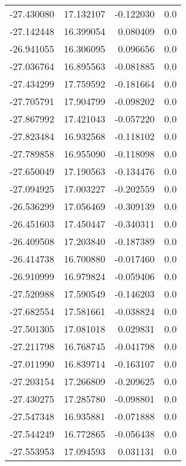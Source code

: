 \begin{tabular}{rrrr}
      -27.430080 &        17.132107 &   -0.122030 &   0.0 \\
      -27.142448 &        16.399054 &    0.080409 &   0.0 \\
      -26.941055 &        16.306095 &    0.096656 &   0.0 \\
      -27.036764 &        16.895563 &   -0.081885 &   0.0 \\
      -27.434299 &        17.759592 &   -0.181664 &   0.0 \\
      -27.705791 &        17.904799 &   -0.098202 &   0.0 \\
      -27.867992 &        17.421043 &   -0.057220 &   0.0 \\
      -27.823484 &        16.932568 &   -0.118102 &   0.0 \\
      -27.789858 &        16.955090 &   -0.118098 &   0.0 \\
      -27.650049 &        17.190563 &   -0.134476 &   0.0 \\
      -27.094925 &        17.003227 &   -0.202559 &   0.0 \\
      -26.536299 &        17.056469 &   -0.309139 &   0.0 \\
      -26.451603 &        17.450447 &   -0.340311 &   0.0 \\
      -26.409508 &        17.203840 &   -0.187389 &   0.0 \\
      -26.414738 &        16.700880 &   -0.017460 &   0.0 \\
      -26.910999 &        16.979824 &   -0.059406 &   0.0 \\
      -27.520988 &        17.590549 &   -0.146203 &   0.0 \\
      -27.682554 &        17.581661 &   -0.038824 &   0.0 \\
      -27.501305 &        17.081018 &    0.029831 &   0.0 \\
      -27.211798 &        16.768745 &   -0.041798 &   0.0 \\
      -27.011990 &        16.839714 &   -0.163107 &   0.0 \\
      -27.203154 &        17.266809 &   -0.209625 &   0.0 \\
      -27.430275 &        17.285780 &   -0.098801 &   0.0 \\
      -27.547348 &        16.935881 &   -0.071888 &   0.0 \\
      -27.544249 &        16.772865 &   -0.056438 &   0.0 \\
      -27.553953 &        17.094593 &    0.031131 &   0.0 \\

\end{tabular}

